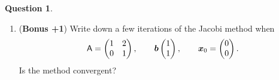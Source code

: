 \documentclass[11pt]{article}
\theoremstyle{definition}
\newtheorem{question}{Question}
\theoremstyle{remark}
\begin{document}
\begin{question}
\begin{enumerate}
        \item
            (\textbf{Bonus +1})
            Write down a few iterations of the Jacobi method when
            \[
                \mathsf A =
                \begin{pmatrix}
                    1 & 2 \\
                    0 & 1
                \end{pmatrix},
                \qquad
                \mathbf{\boldsymbol{b}}
                \begin{pmatrix}
                    1 \\
                    1
                \end{pmatrix},
                \qquad
                \mathbf{\boldsymbol{x}}_0 =
                \begin{pmatrix}
                    0 \\
                    0
                \end{pmatrix}.
            \]
            Is the method convergent?
    \end{enumerate}
\end{question}
\end{document}
